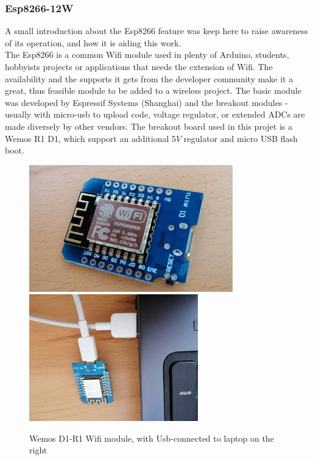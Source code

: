 \documentclass[12 pt, a4paper]{thesis}
\begin{document}
\subsubsection{Esp8266-12W}
A small introduction about the Esp8266 feature was keep here to raise awareness of its operation, and how it is aiding this work. \\
The Esp8266 is a common Wifi module used in plenty of Arduino, students, hobbyists projects or applications that needs the extension of Wifi. The availability and the supports it gets from the developer community make it a great, thus feasible module to be added to a wireless project. The basic module was developed by  Espressif Systems (Shanghai) and the breakout modules - usually with micro-usb to upload code, voltage regulator, or extended ADCs are made diversely by other vendors. The breakout board used in this projet is a Wemos R1 D1, which support an additional $5V$ regulator and micro USB flash boot.\\
\begin{figure}[hbt!]
\centering
\includegraphics[height = 55mm]{Esp8266.jpg}
\hfill
\includegraphics[height = 55mm]{EspSetup.jpg}
\caption{Wemos D1-R1 Wifi module, with Usb-connected to laptop on the right}
\end{figure}
\end{document}
